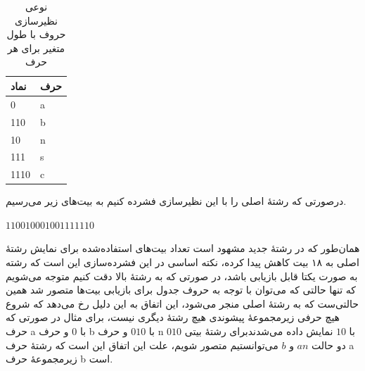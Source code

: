 \begin{table}[h]
        \centering
        \caption{نوعی نظیرسازی حروف با طول متغیر برای هر حرف}
        \label{huffman}
        \begin{tabular}{ll}
        \hline
        نماد & حرف \\ \hline
        0 & a \\
        110 & b \\
        10 & n \\
        111 & s \\
        1110 & c \\ \hline
        \end{tabular}
\end{table}

درصورتی که رشتهٔ اصلی را با این نظیرسازی فشرده کنیم به بیت‌های زیر می‌رسیم.

\begin{center}
        $110010001001111110$
\end{center}

همان‌طور که در رشتهٔ جدید مشهود است تعداد بیت‌های استفاده‌شده برای نمایش
رشتهٔ اصلی به ۱۸ بیت کاهش پیدا کرده، نکته اساسی در این فشرده‌سازی 
این است که رشته به صورت یکتا قابل بازیابی باشد، در صورتی که به رشتهٔ بالا
دقت کنیم متوجه می‌شویم که تنها حالتی که می‌توان با توجه به حروف جدول برای
بازیابی بیت‌ها متصور شد همین حالتی‌ست که به رشتهٔ اصلی منجر می‌شود، این اتفاق به این دلیل
رخ می‌دهد که شروع هیچ حرفی زیرمجموعهٔ پیشوندی هیچ رشتهٔ دیگری نیست، 
برای مثال در صورتی که حرف a با 
$0$ 
و حرف b
با 
$010$ 
و حرف 
n 
با 
$10$ 
نمایش داده می‌شدندبرای رشتهٔ بیتی 
$010$
دو حالت
$an$
و 
$b$
می‌توانستیم متصور شویم، علت این اتفاق این است که رشتهٔ حرف 
a 
زیرمجموعهٔ حرف 
b
است. 